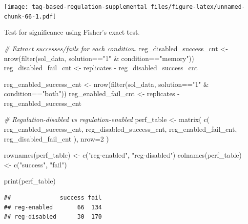 \documentclass[
]{book}
\newenvironment{Shaded}{\begin{snugshade}}{\end{snugshade}}
\newcommand{\AttributeTok}[1]{\textcolor[rgb]{0.77,0.63,0.00}{#1}}
\newcommand{\CommentTok}[1]{\textcolor[rgb]{0.56,0.35,0.01}{\textit{#1}}}
\newcommand{\DecValTok}[1]{\textcolor[rgb]{0.00,0.00,0.81}{#1}}
\newcommand{\FunctionTok}[1]{\textcolor[rgb]{0.00,0.00,0.00}{#1}}
\newcommand{\NormalTok}[1]{#1}
\newcommand{\OtherTok}[1]{\textcolor[rgb]{0.56,0.35,0.01}{#1}}
\newcommand{\SpecialCharTok}[1]{\textcolor[rgb]{0.00,0.00,0.00}{#1}}
\newcommand{\StringTok}[1]{\textcolor[rgb]{0.31,0.60,0.02}{#1}}
\begin{document}
\texttt{[image: tag-based-regulation-supplemental\_files/figure-latex/unnamed-chunk-66-1.pdf]}

Test for significance using Fisher's exact test.

\begin{Shaded}
\begin{Highlighting}[]
\CommentTok{\# Extract successes/fails for each condition.}
\NormalTok{reg\_disabled\_success\_cnt }\OtherTok{\textless{}{-}} \FunctionTok{nrow}\NormalTok{(}\FunctionTok{filter}\NormalTok{(sol\_data, solution}\SpecialCharTok{==}\StringTok{"1"} \SpecialCharTok{\&}\NormalTok{ condition}\SpecialCharTok{==}\StringTok{"memory"}\NormalTok{))}
\NormalTok{reg\_disabled\_fail\_cnt }\OtherTok{\textless{}{-}}\NormalTok{ replicates }\SpecialCharTok{{-}}\NormalTok{ reg\_disabled\_success\_cnt}

\NormalTok{reg\_enabled\_success\_cnt }\OtherTok{\textless{}{-}} \FunctionTok{nrow}\NormalTok{(}\FunctionTok{filter}\NormalTok{(sol\_data, solution}\SpecialCharTok{==}\StringTok{"1"} \SpecialCharTok{\&}\NormalTok{ condition}\SpecialCharTok{==}\StringTok{"both"}\NormalTok{))}
\NormalTok{reg\_enabled\_fail\_cnt }\OtherTok{\textless{}{-}}\NormalTok{ replicates }\SpecialCharTok{{-}}\NormalTok{ reg\_enabled\_success\_cnt}

\CommentTok{\# Regulation{-}disabled vs regulation{-}enabled}
\NormalTok{perf\_table }\OtherTok{\textless{}{-}} \FunctionTok{matrix}\NormalTok{(}
  \FunctionTok{c}\NormalTok{(}
\NormalTok{    reg\_enabled\_success\_cnt,}
\NormalTok{    reg\_disabled\_success\_cnt,}
\NormalTok{    reg\_enabled\_fail\_cnt,}
\NormalTok{    reg\_disabled\_fail\_cnt}
\NormalTok{    ),}
    \AttributeTok{nrow=}\DecValTok{2}
\NormalTok{)}

\FunctionTok{rownames}\NormalTok{(perf\_table) }\OtherTok{\textless{}{-}} \FunctionTok{c}\NormalTok{(}\StringTok{"reg{-}enabled"}\NormalTok{, }\StringTok{"reg{-}disabled"}\NormalTok{)}
\FunctionTok{colnames}\NormalTok{(perf\_table) }\OtherTok{\textless{}{-}} \FunctionTok{c}\NormalTok{(}\StringTok{"success"}\NormalTok{, }\StringTok{"fail"}\NormalTok{)}

\FunctionTok{print}\NormalTok{(perf\_table)}
\end{Highlighting}
\end{Shaded}

\begin{verbatim}
##              success fail
## reg-enabled       66  134
## reg-disabled      30  170
\end{verbatim}
\end{document}
